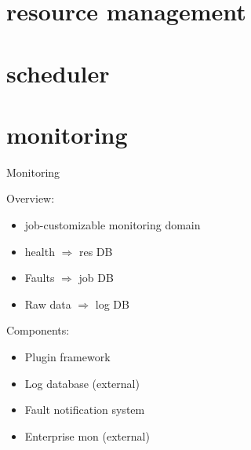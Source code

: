 \documentclass[default,pdf,colorBG,slideColor]{prosper}
\begin{document}
\part{resource management}
\part{scheduler}
\part{monitoring}
\begin{slide}{Monitoring}{\small
\begin{minipage}{0.40\textwidth}
Overview:
\begin{itemize}
  \item{job-customizable monitoring domain}
  \item{health $\Longrightarrow$ res DB}
  \item{Faults $\Longrightarrow$ job DB}
  \item{Raw data $\Longrightarrow$ log DB}
\end{itemize}
\end{minipage}
\hfill
\begin{minipage}{0.50\textwidth}
Components:
\begin{itemize}
  \item{Plugin framework}
  \item{Log database (external)}
  \item{Fault notification system}
  \item{Enterprise mon (external)}
\end{itemize}
\end{minipage}
\vspace{0.5cm}
\begin{center}
\end{center}
}\end{slide}
\end{document}
